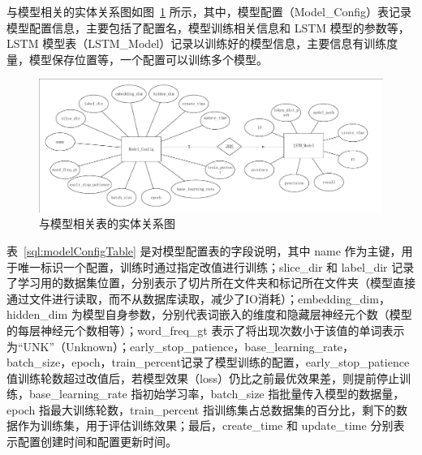 与模型相关的实体关系图如图~\ref{er:model} 所示，其中，模型配置（Model\_Config）表记录模型配置信息，主要包括了配置名，模型训练相关信息和 LSTM 模型的参数等，LSTM 模型表（LSTM\_Model）记录以训练好的模型信息，主要信息有训练度量，模型保存位置等，一个配置可以训练多个模型。

\begin{figure}[!htbp]
	\centering
	\includegraphics[width=1\linewidth]{FIGs/chapter3/model_er.pdf}
	\caption{与模型相关表的实体关系图}\label{er:model}
\end{figure}

 表~\ref{sql:modelConfigTable} 是对模型配置表的字段说明，其中 name 作为主键，用于唯一标识一个配置，训练时通过指定改值进行训练；slice\_dir 和 label\_dir 记录了学习用的数据集位置，分别表示了切片所在文件夹和标记所在文件夹（模型直接通过文件进行读取，而不从数据库读取，减少了IO消耗）；embedding\_dim，hidden\_dim 为模型自身参数，分别代表词嵌入的维度和隐藏层神经元个数（模型的每层神经元个数相等）；word\_freq\_gt 表示了将出现次数小于该值的单词表示为“UNK”（Unknown）；early\_stop\_patience，base\_learning\_rate，batch\_size，epoch，train\_percent记录了模型训练的配置，early\_stop\_patience 值训练轮数超过改值后，若模型效果（loss）仍比之前最优效果差，则提前停止训练，base\_learning\_rate 指初始学习率，batch\_size 指批量传入模型的数据量，epoch 指最大训练轮数，train\_percent 指训练集占总数据集的百分比，剩下的数据作为训练集，用于评估训练效果；最后，create\_time 和 update\_time 分别表示配置创建时间和配置更新时间。

